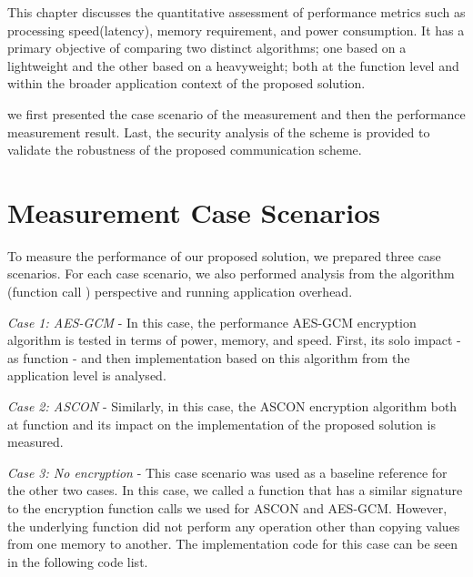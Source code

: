 
This chapter discusses the quantitative assessment of performance metrics such as processing speed(latency), memory requirement, and power consumption. It has a primary  objective of comparing two distinct algorithms; one based on a lightweight and the other based on a heavyweight; both at the function level and within the broader application context of the proposed solution. 

we first presented the case scenario of the measurement and then the performance measurement result. Last, the security analysis of the scheme is provided to validate the robustness of the proposed communication scheme. 

\section{Measurement Case Scenarios}

To measure the performance of our proposed solution, we prepared three case scenarios. For each case scenario, we also performed analysis from the algorithm (function call ) perspective and running application overhead. 

\textit{Case 1: AES-GCM} - In this case, the performance AES-GCM encryption algorithm is tested in terms of power, memory, and speed. First, its solo impact - as function -  and then implementation based on this algorithm from the application level is analysed.


\textit{Case 2: ASCON} - Similarly, in this case, the ASCON encryption algorithm both at function and its impact on the implementation of the proposed solution is measured. 

\textit{Case 3: No encryption} - This case scenario was used as a baseline reference for the other two cases. In this case, we called a function that has a similar signature to the encryption function calls we used for ASCON and AES-GCM. However, the underlying function did not perform any operation other than copying values from one memory to another. The implementation code for this case can be seen in the following code list.

